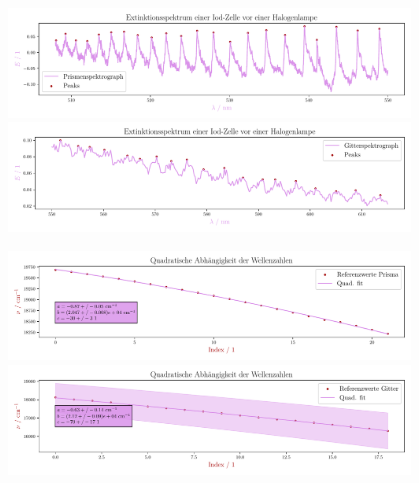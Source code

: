 \documentclass[12pt,english,ngerman]{scrartcl}
\begin{document}
\begin{figure}[H]
	\begin{center}
		\includegraphics[width=0.95\textwidth]{figures/prism_ausschnitt_extinction.pdf}
		\includegraphics[width=0.95\textwidth]{figures/gitter_ausschnitt_extinction.pdf}
	\end{center}
	\caption{}\label{fig:ausschnittPeaks}
\end{figure}

\begin{figure}[H]
	\begin{center}
		\includegraphics[width=0.95\textwidth]{figures/waveNumberFitPrisma.pdf}
		\includegraphics[width=0.95\textwidth]{figures/waveNumberFitGitter.pdf}
	\end{center}
	\caption{}\label{fig:wellenZahlenFit}

\end{figure}
\end{document}
